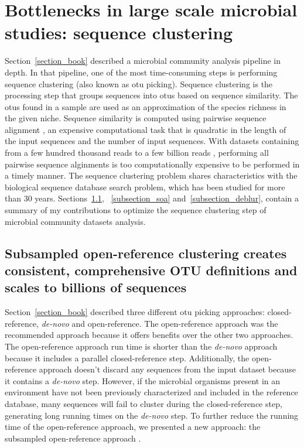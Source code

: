 \section{Bottlenecks in large scale microbial studies: sequence clustering}\label{section_bottlenecks}

Section~\ref{section_book} described a microbial community analysis pipeline in depth.
In that pipeline, one of the most time-consuming steps is performing
sequence clustering (also known as \gls{otu} picking). Sequence
clustering is the processing step that groups sequences into \gls{otu}s
based on sequence similarity. The \gls{otu}s found in a sample are used as an
approximation of the species richness in the given niche. Sequence similarity is
computed using pairwise sequence alignment \cite{Needleman1970, Smith1981}, an expensive
computational task that is quadratic in the length of the input sequences and
the number of input sequences. With
datasets containing from a few hundred thousand reads to a few billion
reads \cite{Goodwin2016}, performing all pairwise sequence alginments is too
computationally expensive to be performed in a timely manner. The sequence clustering
problem shares characteristics with the biological sequence database search problem,
which has been studied for more than 30 years. Sections~\ref{subsection_openref},
~\ref{subsection_soa} and~\ref{subsection_deblur}, contain a summary of my
contributions to optimize the sequence clustering step of microbial community
datasets analysis.

\subsection{Subsampled open-reference clustering creates consistent, comprehensive OTU definitions and scales to billions of sequences}\label{subsection_openref}

Section~\ref{section_book} described three different \gls{otu} picking approaches:
closed-reference, \emph{de-novo} and open-reference. The open-reference approach
was the recommended approach because it offers benefits over the other two
approaches. The open-reference approach run time is shorter than
the \emph{de-novo} approach because it includes a parallel closed-reference step.
Additionally, the open-reference approach doesn't discard any sequences from
the input dataset because it contains a \emph{de-novo} step. However, if the microbial
organisms present in an environment have not been previously characterized and included
in the reference database, many sequences will fail to cluster
during the closed-reference step, generating long running times on the \emph{de-novo} step.
To further reduce the running time of the open-reference approach, we presented
a new approach: the subsampled open-reference approach \cite{Rideout2014}.


